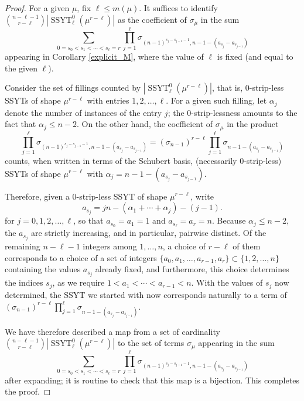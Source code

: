 \documentclass[11pt]{article}
\theoremstyle{definition}
\numberwithin{equation}{section}
\DeclareMathOperator{\ssyt}{SSYT}
\begin{document}
\begin{proof}
For a given $\mu$, fix $\ell\le m(\mu)$. It suffices to identify $\binom{n-\ell-1}{r-\ell}|\ssyt^0_\ell(\mu^{r-\ell})|$ as the coefficient of $\sigma_\mu$ in the sum 
\begin{equation*}
\sum_{0=s_0<s_1<\cdots< s_\ell =r}\prod_{j=1}^{\ell}\sigma_{(n-1)^{s_j-s_{j-1}-1},n-1-(a_{s_j}-a_{s_{j-1}})}
\end{equation*}
appearing in Corollary \ref{explicit_M}, where the value of $\ell$ is fixed (and equal to the given $\ell$).

Consider the set of fillings counted by $|\ssyt^0_\ell(\mu^{r-\ell})|$, that is, 0-strip-less SSYTs of shape $\mu^{r-\ell}$ with entries $1,2,\ldots,\ell$. For a given such filling, let $\alpha_j$ denote the number of instances of the entry $j$; the 0-strip-lessness amounts to the fact that $\alpha_j\le n-2$. On the other hand, the coefficient of $\sigma_\mu$ in the product
\begin{equation*}
\prod_{j=1}^{\ell}\sigma_{(n-1)^{s_j-s_{j-1}-1},n-1-(a_{s_j}-a_{s_{j-1}})}=(\sigma_{n-1})^{r-\ell}\prod_{j=1}^{\ell}\sigma_{n-1-(a_{s_j}-a_{s_{j-1}})}
\end{equation*}
counts, when written in terms of the Schubert basis, (necessarily 0-strip-less) SSYTs of shape $\mu^{r-\ell}$ with $\alpha_j=n-1-(a_{s_j}-a_{s_{j-1}})$. 

Therefore, given a 0-strip-less SSYT of shape $\mu^{r-\ell}$, write
\begin{equation*}
a_{s_j}=jn-(\alpha_1+\cdots+\alpha_j)-(j-1).
\end{equation*}
for $j=0,1,2,\ldots,\ell$, so that $a_{s_0}=a_1=1$ and $a_{s_\ell}=a_r=n$. Because $\alpha_j\le n-2$, the $a_{s_j}$ are strictly increasing, and in particular, pairwise distinct. Of the remaining $n-\ell-1$ integers among $1,\ldots,n$, a choice of $r-\ell$ of them corresponds to a choice of a set of integers $\{a_0,a_1,\ldots,a_{r-1},a_r\}\subset\{1,2,\ldots,n\}$ containing the values $a_{s_j}$ already fixed, and furthermore, this choice determines the indices $s_j$, as we require $1<a_1<\cdots<a_{r-1}<n$. With the values of $s_j$ now determined, the SSYT we started with now corresponds naturally to a term of $(\sigma_{n-1})^{r-\ell}\prod_{j=1}^{\ell}\sigma_{n-1-(a_{s_j}-a_{s_{j-1}})}$.

We have therefore described a map from a set of cardinality $\binom{n-\ell-1}{r-\ell}|\ssyt^0_\ell(\mu^{r-\ell})|$ to the set of terms $\sigma_\mu$ appearing in the sum
\begin{equation*}
\sum_{0=s_0<s_1<\cdots< s_\ell =r}\prod_{j=1}^{\ell}\sigma_{(n-1)^{s_j-s_{j-1}-1},n-1-(a_{s_j}-a_{s_{j-1}})}
\end{equation*}
after expanding; it is routine to check that this map is a bijection. This completes the proof.
\end{proof}
\end{document}
